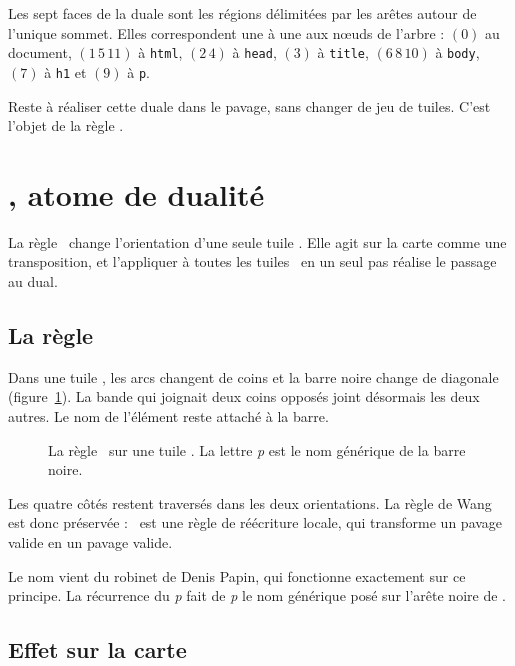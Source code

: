 \documentclass[11pt,a4paper]{article}
\theoremstyle{remark}
\newcommand{\balise}[1]{\texttt{#1}}
\newcommand{\fig}[1]{}
\begin{document}
Les sept faces de la duale sont les régions délimitées par les arêtes autour de
l'unique sommet. Elles correspondent une à une aux nœuds de l'arbre : $(0)$ au
document, $(1\,5\,11)$ à \balise{html}, $(2\,4)$ à \balise{head}, $(3)$ à
\balise{title}, $(6\,8\,10)$ à \balise{body}, $(7)$ à \balise{h1} et $(9)$ à
\balise{p}.

Reste à réaliser cette duale dans le pavage, sans changer de jeu de tuiles.
C'est l'objet de la règle \papin.

\section{\texorpdfstring{\papin}{(pa)(pin)}, atome de dualité}\label{s:papin}

La règle \papin\ change l'orientation d'une seule tuile \CONNECT. Elle agit sur
la carte comme une transposition, et l'appliquer à toutes les tuiles \CONNECT\
en un seul pas réalise le passage au dual.

\subsection{La règle}

Dans une tuile \CONNECT, les arcs changent de coins et la barre noire change de
diagonale (figure~\ref{f:papin}). La bande qui joignait deux coins opposés joint
désormais les deux autres. Le nom de l'élément reste attaché à la barre.

\begin{figure}[ht]
  \centering
  \fig{fig-papin}
  \caption{La règle \papin\ sur une tuile \CONNECT. La lettre \emph{p} est le
    nom générique de la barre noire.}
  \label{f:papin}
\end{figure}

Les quatre côtés restent traversés dans les deux orientations. La règle de Wang
est donc préservée : \papin\ est une règle de réécriture locale, qui transforme
un pavage valide en un pavage valide.

Le nom vient du robinet de Denis Papin, qui fonctionne exactement sur ce
principe. La récurrence du \emph{p} fait de \emph{p} le nom générique posé sur
l'arête noire de \CONNECT.

\subsection{Effet sur la carte}
\end{document}
